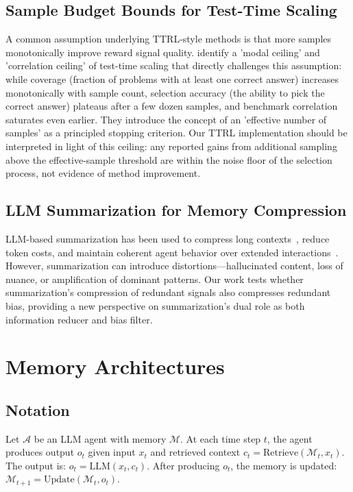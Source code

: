 \documentclass[11pt]{article}
\begin{document}
\subsection{Sample Budget Bounds for Test-Time Scaling}

A common assumption underlying TTRL-style methods is that more samples monotonically improve reward signal quality. \citet{bay2026sampling} identify a 'modal ceiling' and 'correlation ceiling' of test-time scaling that directly challenges this assumption: while coverage (fraction of problems with at least one correct answer) increases monotonically with sample count, selection accuracy (the ability to pick the correct answer) plateaus after a few dozen samples, and benchmark correlation saturates even earlier. They introduce the concept of an 'effective number of samples' as a principled stopping criterion. Our TTRL implementation should be interpreted in light of this ceiling: any reported gains from additional sampling above the effective-sample threshold are within the noise floor of the selection process, not evidence of method improvement.

\subsection{LLM Summarization for Memory Compression}

LLM-based summarization has been used to compress long contexts~\cite{liu2023lost}, reduce token costs, and maintain coherent agent behavior over extended interactions~\cite{wu2024memochat}. However, summarization can introduce distortions---hallucinated content, loss of nuance, or amplification of dominant patterns. Our work tests whether summarization's compression of redundant signals also compresses redundant bias, providing a new perspective on summarization's dual role as both information reducer and bias filter.


\section{Memory Architectures}

\subsection{Notation}

Let $\mathcal{A}$ be an LLM agent with memory $\mathcal{M}$. At each time step $t$, the agent produces output $o_t$ given input $x_t$ and retrieved context $c_t = \text{Retrieve}(\mathcal{M}_t, x_t)$. The output is: $o_t = \text{LLM}(x_t, c_t)$. After producing $o_t$, the memory is updated: $\mathcal{M}_{t+1} = \text{Update}(\mathcal{M}_t, o_t)$.
\end{document}
